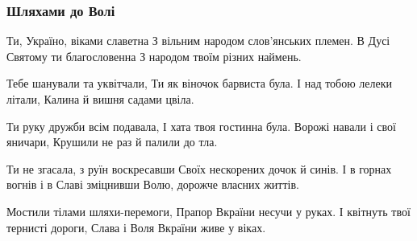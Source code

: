  
 
 

\subsubsection{Шляхами до Волі}

Ти, Україно, віками славетна
З вільним народом слов'янських племен.
В Дусі Святому ти благословенна
З народом твоїм різних наймень.

Тебе шанували та уквітчали,
Ти як віночок барвиста була.
І над тобою лелеки літали,
Калина й вишня садами цвіла.

Ти руку дружби всім подавала,
І хата твоя гостинна була.
Ворожі навали і свої яничари,
Крушили не раз й палили до тла.

Ти не згасала, з руїн воскресавши
Своїх нескорених дочок й синів.
І в горнах вогнів і в Славі зміцнивши
Волю, дорожче власних життів.

Мостили тілами шляхи-перемоги,
Прапор Вкраїни несучи у руках.
І квітнуть твої тернисті дороги,
Слава і Воля Вкраїни живе у віках. 
